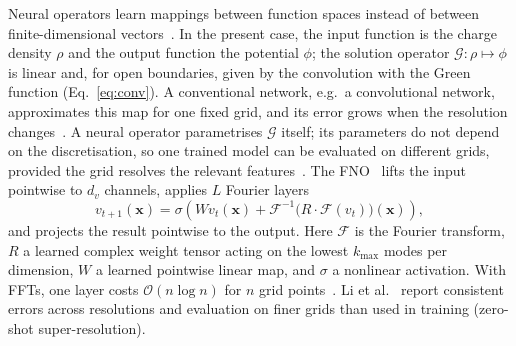 Neural operators learn mappings between function spaces instead of
between finite-dimensional
vectors~\cite{kovachki2023neural,li2021fno,azizzadenesheli2024neural}. In
the present case, the input function is the charge density $\rho$ and the
output function the potential $\phi$; the solution operator
$\mathcal{G}\colon\rho\mapsto\phi$ is linear and, for open boundaries,
given by the convolution with the Green function
(Eq.~\eqref{eq:conv}). A conventional network, e.g.\ a convolutional
network, approximates this map for one fixed grid, and its error grows
when the resolution changes~\cite{li2021fno}. A neural operator
parametrises $\mathcal{G}$ itself; its parameters do not depend on the
discretisation, so one trained model can be evaluated on different grids,
provided the grid resolves the relevant
features~\cite{li2021fno,kovachki2023neural}. The FNO~\cite{li2021fno}
lifts the input pointwise to $d_v$ channels, applies $L$ Fourier layers
\begin{equation}
  v_{t+1}(\mathbf{x}) = \sigma\!\left( W v_t(\mathbf{x})
  + \mathcal{F}^{-1}\!\big( R \cdot \mathcal{F}(v_t) \big)(\mathbf{x})
  \right),
  \label{eq:fourier-layer}
\end{equation}
and projects the result pointwise to the output. Here $\mathcal{F}$ is the
Fourier transform, $R$ a learned complex weight tensor acting on the lowest
$k_\mathrm{max}$ modes per dimension, $W$ a learned pointwise linear map,
and $\sigma$ a nonlinear activation. With FFTs, one layer costs
$\mathcal{O}(n\log n)$ for $n$ grid points~\cite{li2021fno}. Li et
al.~\cite{li2021fno} report consistent errors across resolutions and
evaluation on finer grids than used in training (zero-shot
super-resolution).

